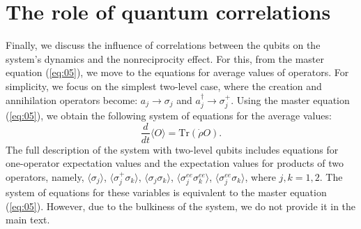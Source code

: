 \documentclass[lettersize,journal]{IEEEtran}
\begin{document}
\section{The role of quantum correlations}

Finally, we discuss the influence of correlations between the qubits on the system's dynamics and the nonreciprocity effect.
For this, from the master equation (\ref{eq:05}), we move to the equations for average values of operators.
For simplicity, we focus on the simplest two-level case, where the creation and annihilation operators become: $a_j \rightarrow \sigma_j$ and $a_j^\dag \rightarrow \sigma_j^+$.
Using the master equation (\ref{eq:05}), we obtain the following system of equations for the average values:
\begin{equation} \label{eq:23}
    \frac{d}{dt}\langle O \rangle = \mathrm{Tr}\left( \dot{\rho} O \right).
\end{equation}
The full description of the system with two-level qubits includes equations for one-operator expectation values and the expectation values for products of two operators, namely, $\langle \sigma_j \rangle$, $\langle \sigma_j^+ \sigma_k \rangle$, $\langle \sigma_j \sigma_k \rangle$, $\langle \sigma_j^{ee} \sigma_k^{ee} \rangle$, $\langle \sigma_j^{ee} \sigma_k \rangle$, where $j,k = 1, 2$.
The system of equations for these variables is equivalent to the master equation (\ref{eq:05}).
However, due to the bulkiness of the system, we do not provide it in the main text.
\end{document}
